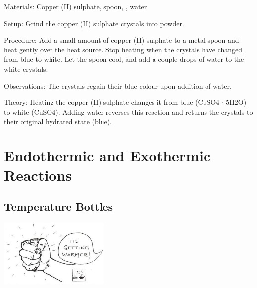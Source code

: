 \begin{multicols}{2}
\begin{description*}
\item[Materials:]{Copper (II) sulphate, spoon, , water}
\item[Setup:]{Grind the copper (II) sulphate crystals into powder.}
\item[Procedure:]{Add a small amount of copper (II) sulphate to a metal spoon and heat gently over the heat source. Stop heating when the crystals have changed from blue to white. Let the spoon cool, and add a couple drops of water to the white crystals.}
\item[Observations:]{The crystals regain their blue colour upon addition of water.}
\item[Theory:]{Heating the copper (II) sulphate changes it from blue (\ce CuSO4 $\cdot$ 5H2O) to white (\ce CuSO4). Adding water reverses this reaction and returns the crystals to their original hydrated state (blue).}
\end{description*}

\columnbreak


\section*{Endothermic and Exothermic Reactions}


\subsection{Temperature Bottles} %

\begin{center}
\includegraphics[width=0.4\textwidth]{./img/source/exothermic.jpg}
\end{center}


\end{multicols}
